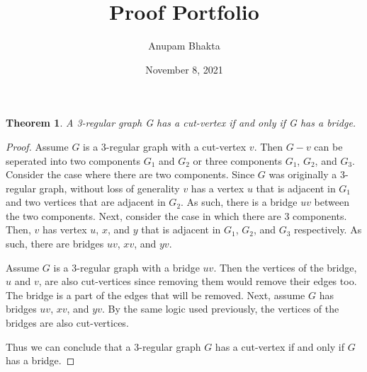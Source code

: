 \documentclass[11pt]{article}
\date{November 8, 2021}
\title{Proof Portfolio}
\author{Anupam Bhakta}
\newtheorem{theorem}{Theorem}
\begin{document}
	
\maketitle

\begin{theorem}
A 3-regular graph G has a cut-vertex if and only if G has a bridge.
\end{theorem}

\begin{proof}
Assume $G$ is a 3-regular graph with a cut-vertex $v$. Then $G-v$ can be seperated into two components $G_1$ and $G_2$ or three components $G_1$, $G_2$, and $G_3$. Consider the case where there are two components. Since $G$ was originally a 3-regular graph, without loss of generality $v$ has a vertex $u$ that is adjacent in $G_1$ and two vertices that are adjacent in $G_2$. As such, there is a bridge $uv$ between the two components. Next, consider the case in which there are  3 components. Then, $v$ has vertex $u$, $x$, and $y$ that is adjacent in $G_1$, $G_2$, and $G_3$ respectively. As such, there are bridges $uv$, $xv$, and $yv$.

Assume $G$ is a 3-regular graph with a bridge $uv$. Then the vertices of the bridge, $u$ and $v$, are also cut-vertices since removing them would remove their edges too. The bridge is a part of the edges that will be removed. Next, assume $G$ has bridges $uv$, $xv$, and $yv$. By the same logic used previously, the vertices of the bridges are also cut-vertices.

Thus we can conclude that a 3-regular graph $G$ has a cut-vertex if and only if $G$ has a bridge.
\end{proof}
\end{document}
